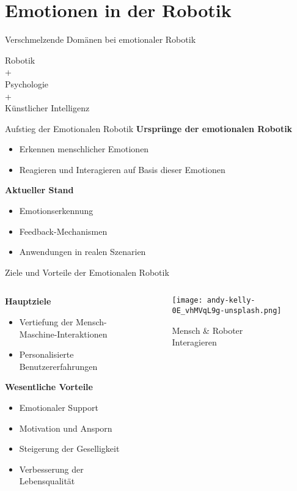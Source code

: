 \documentclass[aspectratio=169]{beamer}
\begin{document}
\section{Emotionen in der Robotik}
\begin{frame}{Verschmelzende Domänen bei emotionaler Robotik}
  \begin{center}
    Robotik\\
    +\\
    Psychologie\\
    +\\
    Künstlicher Intelligenz
  \end{center}
\end{frame}

\begin{frame}{Aufstieg der Emotionalen Robotik}
  \textbf{Ursprünge der emotionalen Robotik}
  \begin{itemize}
    \item Erkennen menschlicher Emotionen
    \item Reagieren und Interagieren auf Basis dieser Emotionen
  \end{itemize}

  \textbf{Aktueller Stand}
  \begin{itemize}
    \item Emotionserkennung
    \item Feedback-Mechanismen
    \item Anwendungen in realen Szenarien
  \end{itemize}
\end{frame}

\begin{frame}{Ziele und Vorteile der Emotionalen Robotik}
  \begin{columns}
    \begin{column}{0.7\textwidth}
      \textbf{Hauptziele}
      \begin{itemize}
        \item Vertiefung der Mensch-Maschine-Interaktionen
        \item Personalisierte Benutzererfahrungen
      \end{itemize}

      \textbf{Wesentliche Vorteile}
      \begin{itemize}
        \item Emotionaler Support
        \item Motivation und Ansporn
        \item Steigerung der Geselligkeit
        \item Verbesserung der Lebensqualität
      \end{itemize}
    \end{column}
    \begin{column}{0.3\textwidth}
      \begin{figure}[h]
        \centering
        \texttt{[image: andy-kelly-0E\_vhMVqL9g-unsplash.png]}
        \caption{Mensch \& Roboter Interagieren}
      \end{figure}
    \end{column}
  \end{columns}
\end{frame}
\end{document}
